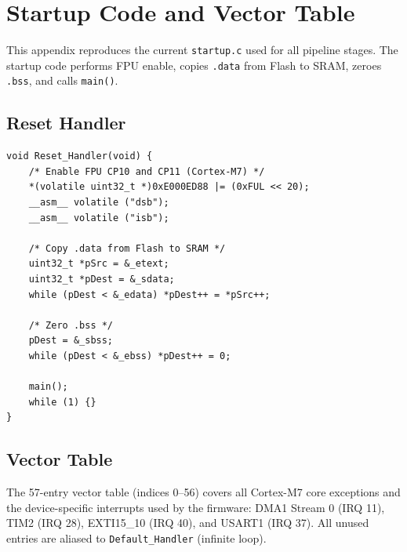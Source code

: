 \chapter{Startup Code and Vector Table}
\label{app:C}

This appendix reproduces the current \texttt{startup.c} used for all pipeline stages. The startup code performs FPU enable, copies \texttt{.data} from Flash to SRAM, zeroes \texttt{.bss}, and calls \texttt{main()}.

\section{Reset Handler}

\begin{lstlisting}[style=cstyle]
void Reset_Handler(void) {
    /* Enable FPU CP10 and CP11 (Cortex-M7) */
    *(volatile uint32_t *)0xE000ED88 |= (0xFUL << 20);
    __asm__ volatile ("dsb");
    __asm__ volatile ("isb");

    /* Copy .data from Flash to SRAM */
    uint32_t *pSrc = &_etext;
    uint32_t *pDest = &_sdata;
    while (pDest < &_edata) *pDest++ = *pSrc++;

    /* Zero .bss */
    pDest = &_sbss;
    while (pDest < &_ebss) *pDest++ = 0;

    main();
    while (1) {}
}
\end{lstlisting}

\section{Vector Table}

The 57-entry vector table (indices 0--56) covers all Cortex-M7 core exceptions and the device-specific interrupts used by the firmware: DMA1 Stream 0 (IRQ 11), TIM2 (IRQ 28), EXTI15\_10 (IRQ 40), and USART1 (IRQ 37). All unused entries are aliased to \texttt{Default\_Handler} (infinite loop).